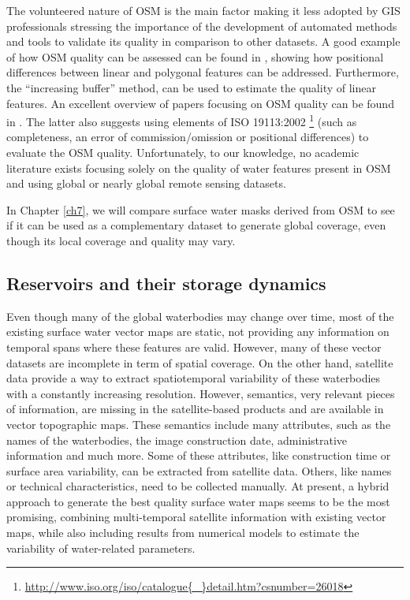 The volunteered nature of OSM is the main factor making it less adopted by GIS professionals \citet{Mooney2010} stressing the importance of the development of automated methods and tools to validate its quality in comparison to other datasets. A good example of how OSM quality can be assessed can be found in \citet{Girres2010}, showing how positional differences between linear and polygonal features can be addressed. Furthermore, the “increasing buffer” method, \citet{Goodchild1997} can be used to estimate the quality of linear features. An excellent overview of papers focusing on OSM quality can be found in \citet{Barron2014}. The latter also suggests using elements of ISO 19113:2002 \footnote{\url{http://www.iso.org/iso/catalogue{\_}detail.htm?csnumber=26018}} (such as completeness, an error of commission/omission or positional differences) to evaluate the OSM quality. Unfortunately, to our knowledge, no academic literature exists focusing solely on the quality of water features present in OSM and using global or nearly global remote sensing datasets.

In Chapter \ref{ch7}, we will compare surface water masks derived from OSM to see if it can be used as a complementary dataset to generate global coverage, even though its local coverage and quality may vary.

\subsection{Reservoirs and their storage dynamics}
Even though many of the global waterbodies may change over time, most of the existing surface water vector maps are static, not providing any information on temporal spans where these features are valid. However, many of these vector datasets are incomplete in term of spatial coverage. On the other hand, satellite data provide a way to extract spatiotemporal variability of these waterbodies with a constantly increasing resolution. However, semantics, very relevant pieces of information, are missing in the satellite-based products and are available in vector topographic maps. These semantics include many attributes, such as the names of the waterbodies, the image construction date, administrative information and much more. Some of these attributes, like construction time or surface area variability, can be extracted from satellite data. Others, like names or technical characteristics, need to be collected manually. At present, a hybrid approach to generate the best quality surface water maps seems to be the most promising, combining multi-temporal satellite information with existing vector maps, while also including results from numerical models to estimate the variability of water-related parameters.


